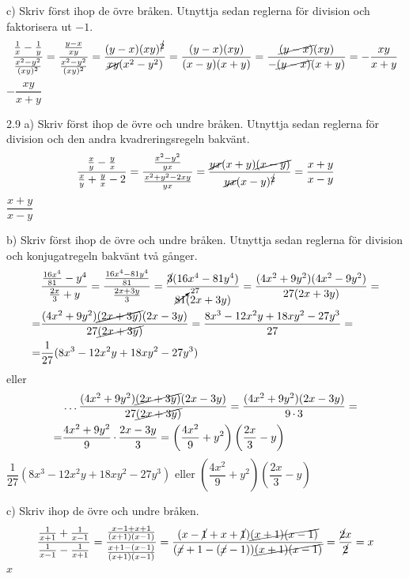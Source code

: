 \begin{task}{c)}
	Skriv först ihop de övre bråken. Utnyttja sedan reglerna för division och faktorisera ut $-1$.
	\[\dfrac{\frac{1}{x}-\frac{1}{y}}{\frac{x^2-y^2}{(xy)^2}}=
	\dfrac{\frac{y-x}{xy}}{\frac{x^2-y^2}{(xy)^2}}=
	\dfrac{(y-x)(xy)^{\cancel{2}}}{\cancel{xy}(x^2-y^2)}=
	\dfrac{(y-x)(xy)}{(x-y)(x+y)}=
	\dfrac{\cancel{(y-x)}(xy)}{-\cancel{(y-x)}(x+y)}=
	-\dfrac{xy}{x+y}\]
	\ans $-\dfrac{xy}{x+y}$
\end{task}

\begin{task}{2.9 a)}
	Skriv först ihop de övre och undre bråken. Utnyttja sedan reglerna för division och den andra kvadreringsregeln bakvänt.
	\[\dfrac{\frac{x}{y}- \frac{y}{x}}{\frac{x}{y}+\frac{y}{x}-2}=
	\dfrac{\frac{x^2-y^2}{yx}}{\frac{x^2+y^2-2xy}{yx}}=
	\dfrac{\cancel{yx}(x+y)\cancel{(x-y)}}{\cancel{yx}(x-y)^{\cancel{2}}}=
	\dfrac{x+y}{x-y}\]
	\ans $\dfrac{x+y}{x-y}$
\end{task}

\begin{task}{b)}
	Skriv först ihop de övre och undre bråken. Utnyttja sedan reglerna för division och konjugatregeln bakvänt två gånger.
	\begin{align*}
	&\dfrac{\frac{16x^4}{81}-y^4}{\frac{2x}{3}+y}=
	\dfrac{\frac{16x^4-81y^4}{81}}{\frac{2x+3y}{3}}=
	\dfrac{\cancel{3}(16x^4-81y^4)}{\cancelto{27}{81}(2x+3y)}= 
	\dfrac{(4x^2+9y^2)(4x^2-9y^2)}{27(2x+3y)}= \\ =
	&\dfrac{(4x^2+9y^2)\cancel{(2x+3y)}(2x-3y)}{27\cancel{(2x+3y)}}=
	\dfrac{8x^3-12x^2y+18xy^2-27y^3}{27}= \\ =
	&\dfrac{1}{27}(8x^3-12x^2y+18xy^2-27y^3)
	\end{align*}
	eller
	\begin{align*}
	&\ldots\dfrac{(4x^2+9y^2)\cancel{(2x+3y)}(2x-3y)}{27\cancel{(2x+3y)}}=
	\dfrac{(4x^2+9y^2)(2x-3y)}{9\operatorname{\cdot}3}= \\ =
	&\dfrac{4x^2+9y^2}{9}\operatorname{\cdot}\dfrac{2x-3y}{3}=
	\left(\dfrac{4x^2}{9}+y^2\right)\left(\dfrac{2x}{3}-y\right)
	\end{align*}
	\ans $\dfrac{1}{27}(8x^3-12x^2y+18xy^2-27y^3)$ eller $\left(\dfrac{4x^2}{9}+y^2\right)\left(\dfrac{2x}{3}-y\right)$
\end{task}

\begin{task}{c)}
	Skriv ihop de övre och undre bråken.
	\[\dfrac{\frac{1}{x+1}+\frac{1}{x-1}}{\frac{1}{x-1}-\frac{1}{x+1}}=
	\dfrac{\frac{x-1+x+1}{(x+1)(x-1)}}{\frac{x+1-(x-1)}{(x+1)(x-1)}}=
	\dfrac{(x-\cancel{1}+x+\cancel{1})\cancel{(x+1)(x-1)}}{(\cancel{x}+1-(\cancel{x}-1))\cancel{(x+1)(x-1)}}=
	\dfrac{\cancel{2}x}{\cancel{2}}=
	x\]
	\ans $x$
\end{task}

